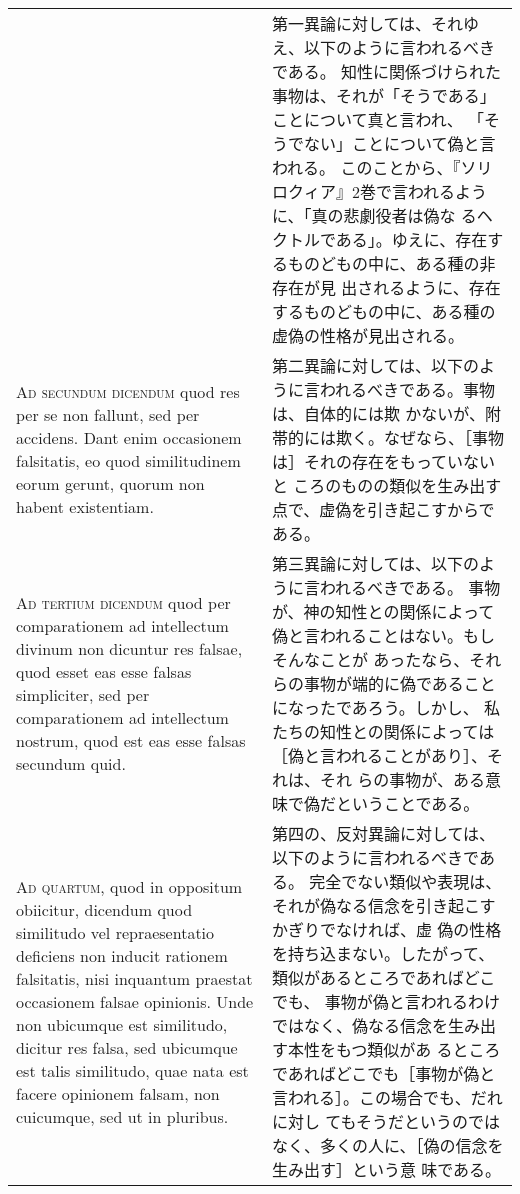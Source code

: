 \documentclass[10pt]{jsarticle} %
\begin{document}
\begin{longtable}{p{21em}p{21em}}
&

第一異論に対しては、それゆえ、以下のように言われるべきである。
知性に関係づけられた事物は、それが「そうである」ことについて真と言われ、
 「そうでない」ことについて偽と言われる。
このことから、『ソリロクィア』2巻で言われるように、「真の悲劇役者は偽な
 るヘクトルである」。ゆえに、存在するものどもの中に、ある種の非存在が見
 出されるように、存在するものどもの中に、ある種の虚偽の性格が見出される。

\\

{\scshape Ad secundum dicendum} quod res per se non
fallunt, sed per accidens. Dant enim occasionem falsitatis, eo quod
similitudinem eorum gerunt, quorum non habent existentiam.

&

第二異論に対しては、以下のように言われるべきである。事物は、自体的には欺
かないが、附帯的には欺く。なぜなら、［事物は］それの存在をもっていないと
ころのものの類似を生み出す点で、虚偽を引き起こすからである。




\\


{\scshape Ad tertium dicendum} quod per comparationem ad
intellectum divinum non dicuntur res falsae, quod esset eas esse falsas
simpliciter, sed per comparationem ad intellectum nostrum, quod est eas
esse falsas secundum quid.

&

第三異論に対しては、以下のように言われるべきである。
事物が、神の知性との関係によって偽と言われることはない。もしそんなことが
 あったなら、それらの事物が端的に偽であることになったであろう。しかし、
 私たちの知性との関係によっては［偽と言われることがあり］、それは、それ
 らの事物が、ある意味で偽だということである。

\\


{\scshape Ad quartum}, quod in oppositum obiicitur,
dicendum quod similitudo vel repraesentatio deficiens non inducit
rationem falsitatis, nisi inquantum praestat occasionem falsae
opinionis. Unde non ubicumque est similitudo, dicitur res falsa, sed
ubicumque est talis similitudo, quae nata est facere opinionem falsam,
non cuicumque, sed ut in pluribus.

&

第四の、反対異論に対しては、以下のように言われるべきである。
完全でない類似や表現は、それが偽なる信念を引き起こすかぎりでなければ、虚
 偽の性格を持ち込まない。したがって、類似があるところであればどこでも、
 事物が偽と言われるわけではなく、偽なる信念を生み出す本性をもつ類似があ
 るところであればどこでも［事物が偽と言われる］。この場合でも、だれに対し
 てもそうだというのではなく、多くの人に、［偽の信念を生み出す］という意
 味である。


\end{longtable}
\end{document}
